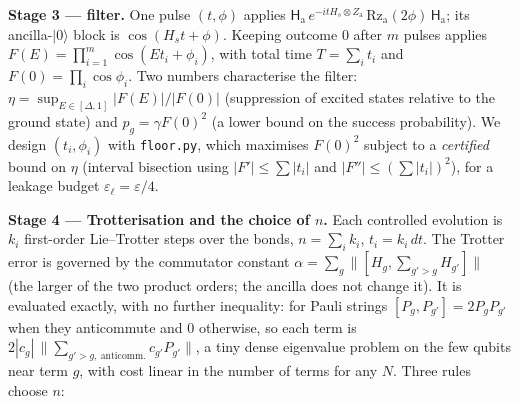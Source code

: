 \documentclass[
]{article}
\begin{document}
\textbf{Stage 3 --- filter.} One pulse \((t,\phi)\) applies
\(\mathsf H_{\mathrm{a}}\,e^{-itH_s\otimes Z_{\mathrm{a}}}\,\mathrm{Rz}_{\mathrm{a}}(2\phi)\,\mathsf H_{\mathrm{a}}\);
its ancilla-\(|0\rangle\) block is \(\cos(H_st+\phi)\). Keeping outcome
\(0\) after \(m\) pulses applies
\(F(E)=\prod_{i=1}^m\cos(Et_i+\phi_i)\), with total time \(T=\sum_it_i\)
and \(F(0)=\prod_i\cos\phi_i\). Two numbers characterise the filter:
\(\eta=\sup_{E\in[\Delta,1]}|F(E)|/|F(0)|\) (suppression of excited
states relative to the ground state) and \(p_g=\gamma F(0)^2\) (a lower
bound on the success probability). We design \((t_i,\phi_i)\) with
\texttt{floor.py}, which maximises \(F(0)^2\) subject to a
\emph{certified} bound on \(\eta\) (interval bisection using
\(|F'|\le\sum|t_i|\) and \(|F''|\le(\sum|t_i|)^2\)), for a leakage
budget \(\varepsilon_\ell=\varepsilon/4\).

\textbf{Stage 4 --- Trotterisation and the choice of \(n\).} Each
controlled evolution is \(k_i\) first-order Lie--Trotter steps over the
bonds, \(n=\sum_ik_i\), \(t_i=k_i\,dt\). The Trotter error is governed
by the commutator constant
\(\alpha=\sum_g\big\|[H_g,\sum_{g'>g}H_{g'}]\big\|\) (the larger of the
two product orders; the ancilla does not change it). It is evaluated
exactly, with no further inequality: for Pauli strings
\([P_g,P_{g'}]=2P_gP_{g'}\) when they anticommute and \(0\) otherwise,
so each term is
\(2|c_g|\,\|\sum_{g'>g,\ \text{anticomm.}}c_{g'}P_{g'}\|\), a tiny dense
eigenvalue problem on the few qubits near term \(g\), with cost linear
in the number of terms for any \(N\). Three rules choose \(n\):
\end{document}
